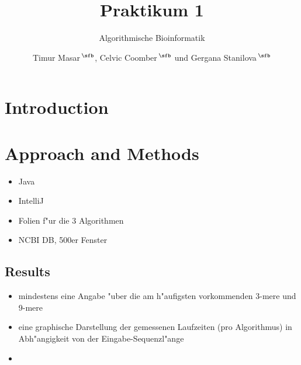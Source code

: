\documentclass{bioinfo}
\begin{document}

\subtitle{Algorithmische Bioinformatik}

\title[short Title]{Praktikum 1}
\author[Sample \textit{et~al}.]{Timur Masar\,$^{\text{\sfb}}$, Celvic Coomber\,$^{\text{\sfb}}$ und Gergana Stanilova\,$^{\text{\sfb}}$}
\address{$^{\text{\sf}}$Mathematik und Informatik, Freie Universit"at Berlin}
\history{}
\editor{}


\maketitle

\section{Introduction}



\section{Approach and Methods}
\begin{itemize}
\item Java
\item IntelliJ
\item Folien f"ur die 3 Algorithmen
\item NCBI DB, 500er Fenster
\end{itemize}
\begin{methods}
\section{Results}

\begin{itemize}
\item mindestens eine Angabe "uber die am h"aufigsten vorkommenden 3-mere und 9-mere
\item eine graphische Darstellung der gemessenen Laufzeiten (pro Algorithmus) in Abh"angigkeit von der Eingabe-Sequenzl"ange
\item  
\end{itemize}


\end{methods}
\end{document}
